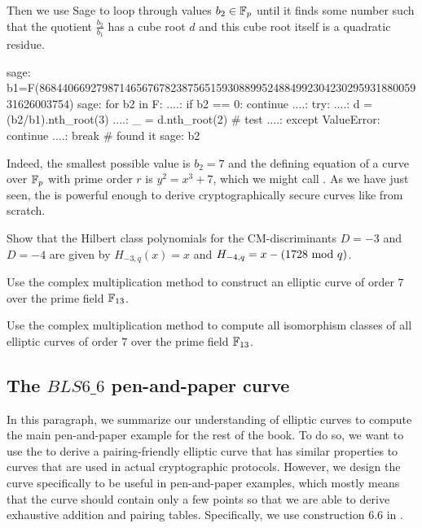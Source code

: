 \begin{example}
Then we use Sage to loop through values $b_2\in \mathbb{F}_p$ until it finds some number such that the quotient $\frac{b_2}{b_1}$ has a cube root $d$ and this cube root itself is a quadratic residue. 
\begin{sagecommandline}
sage: b1=F(86844066927987146567678238756515930889952488499230423029593188005931626003754)
sage: for b2 in F:
....:     if b2 == 0: continue
....:     try:
....:         d = (b2/b1).nth_root(3)
....:         _ = d.nth_root(2) # test
....:     except ValueError: continue
....:     break # found it
sage: b2
\end{sagecommandline}
Indeed, the smallest possible value is $b_2=7$ and the defining  equation of a curve over $\mathbb{F}_p$ with prime order $r$ is 
$
y^2 = x^3 + 7
$,
which we might call . As we have just seen, the  is powerful enough to derive cryptographically secure curves like  from scratch.
\end{example}
\begin{exercise}
\label{ex:Low_order_Hilbert_polys} Show that the Hilbert class polynomials for the CM-discriminants $D=-3$ and $D=-4$ are given by  $H_{-3,q}(x)=x$ and $H_{-4,q}= x-(1728 \text{ mod } q)$.
\end{exercise}
\begin{exercise}
Use the complex multiplication method to construct an elliptic curve of order $7$ over the prime field $\mathbb{F}_{13}$.
\end{exercise}
\begin{exercise}
Use the complex multiplication method to compute all isomorphism classes of all elliptic curves of order $7$ over the prime field $\mathbb{F}_{13}$.
\end{exercise}
\subsection{The $BLS6\_6$ pen-and-paper curve}\label{BLS6}

In this paragraph, we summarize our understanding of elliptic curves to compute the main pen-and-paper example for the rest of the book. To do so, we want to use the  to derive a pairing-friendly elliptic curve that has similar properties to curves that are used in actual cryptographic protocols. However, we design the curve specifically to be useful in pen-and-paper examples, which mostly means that the curve should contain only a few points so that we are able to derive exhaustive addition and pairing tables. Specifically, we use construction 6.6 in \cite{freeman-2020}.

